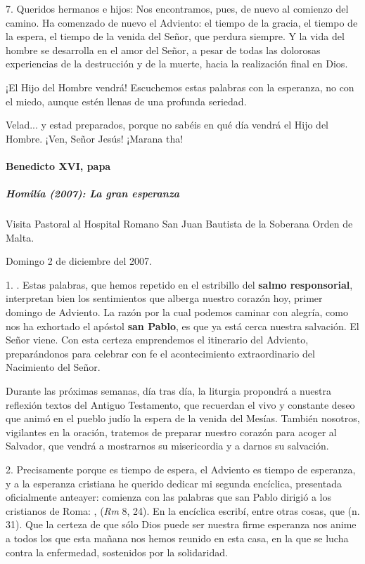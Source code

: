 \documentclass[]{article}
\let\oldparagraph\paragraph
\renewcommand{\paragraph}[1]{\oldparagraph{#1}\mbox{}}
\let\oldsubparagraph\subparagraph
\renewcommand{\subparagraph}[1]{\oldsubparagraph{#1}\mbox{}}
\begin{document}
7. Queridos hermanos e hijos: Nos encontramos, pues, de nuevo al comienzo del camino. Ha comenzado de nuevo el Adviento: el tiempo de la gracia, el tiempo de la espera, el tiempo de la venida del Señor, que perdura siempre. Y la vida del hombre se desarrolla en el amor del Señor, a pesar de todas las dolorosas experiencias de la destrucción y de la muerte, hacia la realización final en Dios.

¡El Hijo del Hombre vendrá! Escuchemos estas palabras con la esperanza, no con el miedo, aunque estén llenas de una profunda seriedad.

Velad... y estad preparados, porque no sabéis en qué día vendrá el Hijo del Hombre. ¡Ven, Señor Jesús! ¡Marana tha!


\paragraph{Benedicto XVI, papa}\label{benedicto-xvi-papa}

\subparagraph{Homilía (2007): La gran 	esperanza}\label{homiluxeda-la-gran-esperanza}

Visita Pastoral al Hospital Romano San Juan Bautista de la Soberana Orden de Malta.

Domingo 2 de diciembre del 2007.

1. . Estas palabras, que hemos repetido en el estribillo del \textbf{salmo responsorial}, interpretan bien los sentimientos que alberga nuestro corazón hoy, primer domingo de Adviento. La razón por la cual podemos caminar con alegría, como nos ha exhortado el apóstol \textbf{san Pablo}, es que ya está cerca nuestra salvación. El Señor viene. Con esta certeza emprendemos el itinerario del Adviento, preparándonos para celebrar con fe el acontecimiento extraordinario del Nacimiento del Señor.

Durante las próximas semanas, día tras día, la liturgia propondrá a nuestra reflexión textos del Antiguo Testamento, que recuerdan el vivo y constante deseo que animó en el pueblo judío la espera de la venida del Mesías. También nosotros, vigilantes en la oración, tratemos de preparar nuestro corazón para acoger al Salvador, que vendrá a mostrarnos su misericordia y a darnos su salvación.

2. Precisamente porque es tiempo de espera, el Adviento es tiempo de esperanza, y a la esperanza cristiana he querido dedicar mi segunda encíclica, presentada oficialmente anteayer: comienza con las palabras que san Pablo dirigió a los cristianos de Roma: \emph{},  (\emph{Rm} 8, 24). En la encíclica escribí, entre otras cosas, que  (n. 31). Que la certeza de que sólo Dios puede ser nuestra firme esperanza nos anime a todos los que esta mañana nos hemos reunido en esta casa, en la que se lucha contra la enfermedad, sostenidos por la solidaridad.
\end{document}
